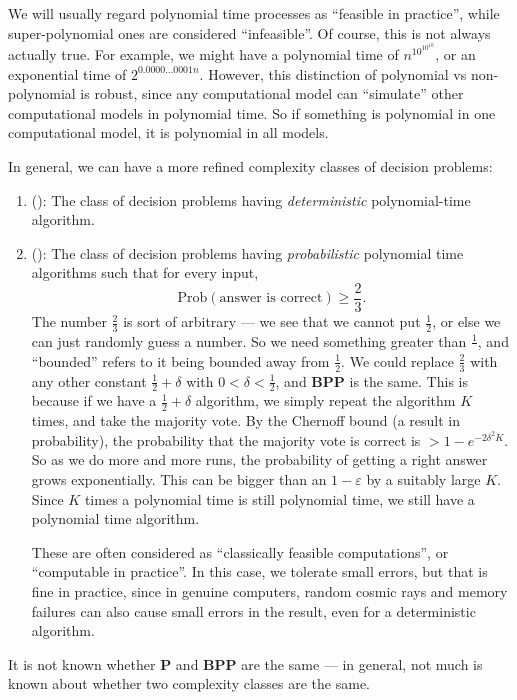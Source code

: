 \documentclass[a4paper]{article}
\begin{document}
We will usually regard polynomial time processes as ``feasible in practice'', while super-polynomial ones are considered ``infeasible''. Of course, this is not always actually true. For example, we might have a polynomial time of $n^{10^{10^10}}$, or an exponential time of $2^{0.0000\ldots0001 n}$. However, this distinction of polynomial vs non-polynomial is robust, since any computational model can ``simulate'' other computational models in polynomial time. So if something is polynomial in one computational model, it is polynomial in all models.

In general, we can have a more refined complexity classes of decision problems:
\begin{enumerate}
  \item {} (): The class of decision problems having \emph{deterministic} polynomial-time algorithm.
  \item {} (): The class of decision problems having \emph{probabilistic} polynomial time algorithms such that for every input,
    \[
      \mathrm{Prob}(\text{answer is correct}) \geq \frac{2}{3}.
    \]
    The number $\frac{2}{3}$ is sort of arbitrary --- we see that we cannot put $\frac{1}{2}$, or else we can just randomly guess a number. So we need something greater than $\frac{1}{}$, and ``bounded'' refers to it being bounded away from $\frac{1}{2}$. We could replace $\frac{2}{3}$ with any other constant $\frac{1}{2} + \delta$ with $0 < \delta < \frac{1}{2}$, and \textbf{BPP} is the same. This is because if we have a $\frac{1}{2} + \delta$ algorithm, we simply repeat the algorithm $K$ times, and take the majority vote. By the Chernoff bound (a result in probability), the probability that the majority vote is correct is $> 1 - e^{-2 \delta^2 K}$. So as we do more and more runs, the probability of getting a right answer grows exponentially. This can be bigger than an $1 - \varepsilon$ by a suitably large $K$. Since $K$ times a polynomial time is still polynomial time, we still have a polynomial time algorithm.

    These are often considered as ``classically feasible computations'', or ``computable in practice''. In this case, we tolerate small errors, but that is fine in practice, since in genuine computers, random cosmic rays and memory failures can also cause small errors in the result, even for a deterministic algorithm.
\end{enumerate}
It is not known whether \textbf{P} and \textbf{BPP} are the same --- in general, not much is known about whether two complexity classes are the same.
\end{document}
